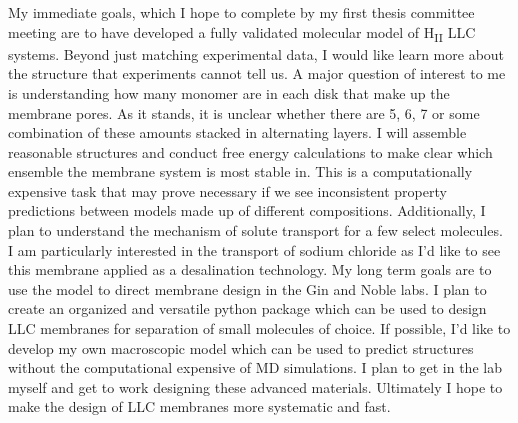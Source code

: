\documentclass[12pt]{article}
\begin{document}
My immediate goals, which I hope to complete by my first thesis committee meeting are to have developed a fully validated molecular model of H\textsubscript{II} LLC systems. Beyond just matching experimental data, I would like learn more about the structure that experiments cannot tell us. A major question of interest to me is understanding how many monomer are in each disk that make up the membrane pores. As it stands, it is unclear whether there are 5, 6, 7 or some combination of these amounts stacked in alternating layers. I will assemble reasonable structures and conduct free energy calculations to make clear which ensemble the membrane system is most stable in. This is a computationally expensive task that may prove necessary if we see inconsistent property predictions between models made up of different compositions. Additionally, I plan to understand the mechanism of solute transport for a few select molecules. I am particularly interested in the transport of sodium chloride as I’d like to see this membrane applied as a desalination technology.
My long term goals are to use the model to direct membrane design in the Gin and Noble labs. I plan to create an organized and versatile python package which can be used to design LLC membranes for separation of small molecules of choice. If possible, I’d like to develop my own macroscopic model which can be used to predict structures without the computational expensive of MD simulations. I plan to get in the lab myself and get to work designing these advanced materials. Ultimately I hope to make the design of LLC membranes more systematic and fast.


\end{document}
